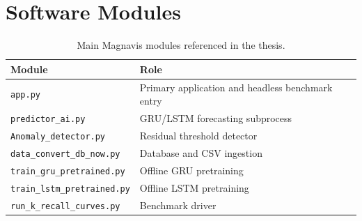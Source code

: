 \chapter{Software Modules}\doublespacing
\label{AppendixB}

\begin{table}[htbp]
\centering
\caption{Main Magnavis modules referenced in the thesis.}
\label{tab:modules}
\begin{tabular}{ll}
\toprule
Module & Role \\
\midrule
\texttt{app.py} & Primary application and headless benchmark entry \\
\texttt{predictor\_ai.py} & GRU/LSTM forecasting subprocess \\
\texttt{Anomaly\_detector.py} & Residual threshold detector \\
\texttt{data\_convert\_db\_now.py} & Database and CSV ingestion \\
\texttt{train\_gru\_pretrained.py} & Offline GRU pretraining \\
\texttt{train\_lstm\_pretrained.py} & Offline LSTM pretraining \\
\texttt{run\_k\_recall\_curves.py} & Benchmark driver \\
\bottomrule
\end{tabular}
\end{table}
